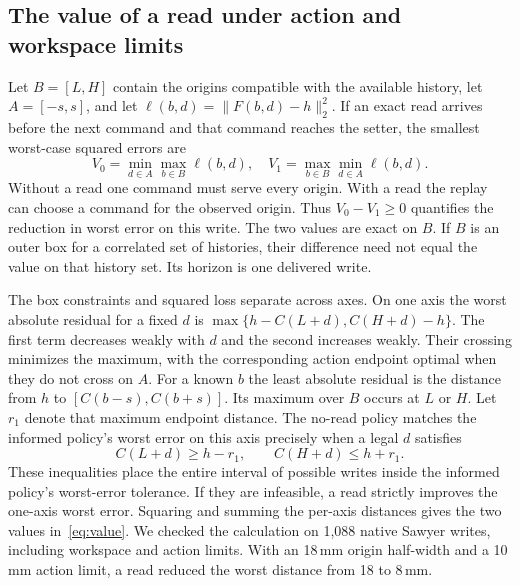 \subsection{The value of a read under action and workspace limits}
Let $B=[L,H]$ contain the origins compatible with the available history, let $A=[-s,s]$, and let $\ell(b,d)=\|F(b,d)-h\|_2^2$. If an exact read arrives before the next command and that command reaches the setter, the smallest worst-case squared errors are
\begin{equation}
 V_0=\min_{d\in A}\max_{b\in B}\ell(b,d),\quad
 V_1=\max_{b\in B}\min_{d\in A}\ell(b,d).\label{eq:value}
\end{equation}
Without a read one command must serve every origin. With a read the replay can choose a command for the observed origin. Thus $V_0-V_1\geq0$ quantifies the reduction in worst error on this write. The two values are exact on $B$. If $B$ is an outer box for a correlated set of histories, their difference need not equal the value on that history set. Its horizon is one delivered write.

The box constraints and squared loss separate across axes. On one axis the worst absolute residual for a fixed $d$ is $\max\{h-C(L+d),C(H+d)-h\}$. The first term decreases weakly with $d$ and the second increases weakly. Their crossing minimizes the maximum, with the corresponding action endpoint optimal when they do not cross on $A$. For a known $b$ the least absolute residual is the distance from $h$ to $[C(b-s),C(b+s)]$. Its maximum over $B$ occurs at $L$ or $H$. Let $r_1$ denote that maximum endpoint distance. The no-read policy matches the informed policy's worst error on this axis precisely when a legal $d$ satisfies
\begin{equation}
 C(L+d)\ge h-r_1,\qquad C(H+d)\le h+r_1 .\label{eq:criterion}
\end{equation}
These inequalities place the entire interval of possible writes inside the informed policy's worst-error tolerance. If they are infeasible, a read strictly improves the one-axis worst error. Squaring and summing the per-axis distances gives the two values in~\eqref{eq:value}. We checked the calculation on 1,088 native Sawyer writes, including workspace and action limits. With an 18\,mm origin half-width and a 10\,mm action limit, a read reduced the worst distance from 18 to 8\,mm.

